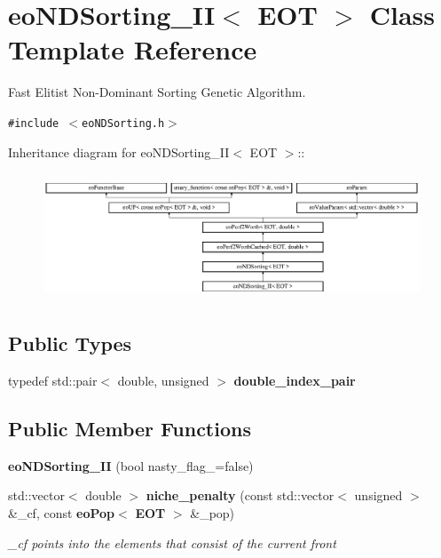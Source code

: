 \section{eo\-NDSorting\_\-II$<$ EOT $>$ Class Template Reference}
\label{classeo_n_d_sorting___i_i}
Fast Elitist Non-Dominant Sorting Genetic Algorithm.  


{\tt \#include $<$eo\-NDSorting.h$>$}

Inheritance diagram for eo\-NDSorting\_\-II$<$ EOT $>$::\begin{figure}[H]
\begin{center}
\leavevmode
\includegraphics[height=3.78378cm]{classeo_n_d_sorting___i_i}
\end{center}
\end{figure}
\subsection*{Public Types}
\begin{CompactItemize}
\item 
typedef std::pair$<$ double, unsigned $>$ {\bf double\_\-index\_\-pair}\label{classeo_n_d_sorting___i_i_w0}

\end{CompactItemize}
\subsection*{Public Member Functions}
\begin{CompactItemize}
\item 
{\bf eo\-NDSorting\_\-II} (bool nasty\_\-flag\_\-=false)\label{classeo_n_d_sorting___i_i_a0}

\item 
std::vector$<$ double $>$ {\bf niche\_\-penalty} (const std::vector$<$ unsigned $>$ \&\_\-cf, const {\bf eo\-Pop}$<$ {\bf EOT} $>$ \&\_\-pop)\label{classeo_n_d_sorting___i_i_a1}

\begin{CompactList}\small\item\em \_\-cf points into the elements that consist of the current front \item\end{CompactList}\end{CompactItemize}


